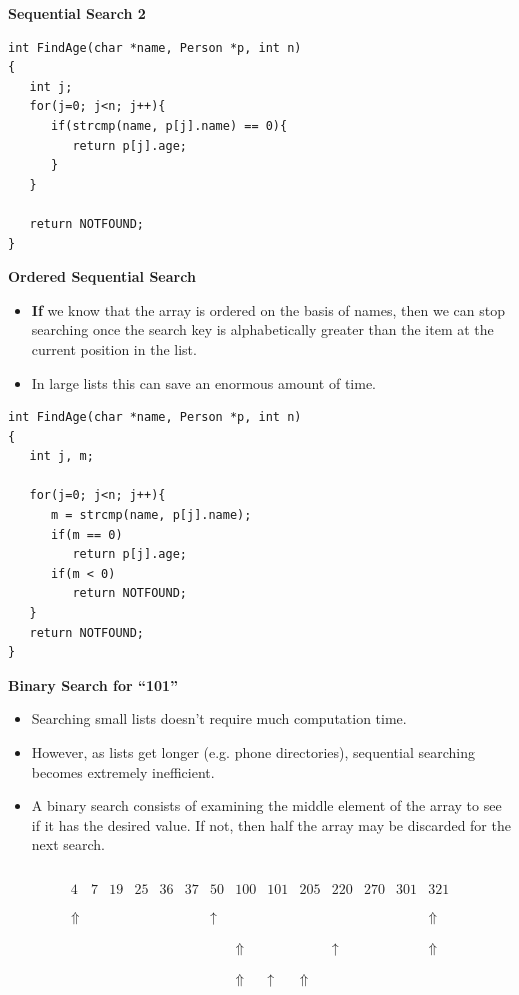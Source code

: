 \documentclass[a4,portraitt]{slides}
\begin{document}
\newpage
{\samepage
\begin{center}
{\Large{\bf Sequential Search 2}}
\end{center}
\begin{verbatim}
int FindAge(char *name, Person *p, int n)
{
   int j;
   for(j=0; j<n; j++){
      if(strcmp(name, p[j].name) == 0){
         return p[j].age;
      }
   }

   return NOTFOUND;
}
\end{verbatim}
}

\newpage
{\samepage
\begin{center}
{\Large{\bf Ordered Sequential Search}}
\end{center}
\begin{itemize}
\item {\bf If} we know that the array is ordered on the basis of names, then we can stop searching once the search key is alphabetically greater than the item at the current position in the list.
\item In large lists this can save an enormous amount of time.
\end{itemize}
\begin{verbatim}
int FindAge(char *name, Person *p, int n)
{
   int j, m;

   for(j=0; j<n; j++){
      m = strcmp(name, p[j].name);
      if(m == 0)
         return p[j].age;
      if(m < 0)
         return NOTFOUND;
   }
   return NOTFOUND;
}
\end{verbatim}
}

\newpage
{\samepage
\begin{center}
{\Large{\bf Binary Search for ``101''}}
\end{center}
\begin{itemize}
\item Searching small lists doesn't require much computation time.
\item However, as lists get longer (e.g. phone directories), sequential searching becomes extremely inefficient.
\item A binary search consists of examining the middle element of the array to see if it has the desired value. If not, then half the array may be discarded for the next search.
\end{itemize}
{\tiny
\[
\begin{array}{cccccccccccccc}
\\
\\
4 & 7 & 19 & 25 & 36 & 37 & 50 & 100 & 101 & 205 & 220 & 270 & 301 & 321 \\
\\
\\
\Uparrow & & & & & & \uparrow & & & & & & & \Uparrow \\
\\
\\
& & & & & & & \Uparrow & & & \uparrow & & & \Uparrow \\
\\
\\
& & & & & & & \Uparrow & \uparrow & \Uparrow & & & & \\
\end{array}
\]
}
}
\end{document}
